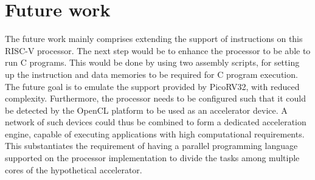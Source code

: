 \section{Future work}
\label{sect7_2}
The future work mainly comprises extending the support of instructions on this RISC-V processor. The next step would be to enhance the processor to be able to run C programs. This would be done by using two assembly scripts, for setting up the instruction and data memories to be required for C program execution. The future goal is to emulate the support provided by PicoRV32, with reduced complexity. \newline\newline
Furthermore, the processor needs to be configured such that it could be detected by the OpenCL platform to be used as an accelerator device. A network of such devices could thus be combined to form a dedicated acceleration engine, capable of executing applications with high computational requirements. This substantiates the requirement of having a parallel programming language supported on the processor implementation to divide the tasks among multiple cores of the hypothetical accelerator.

